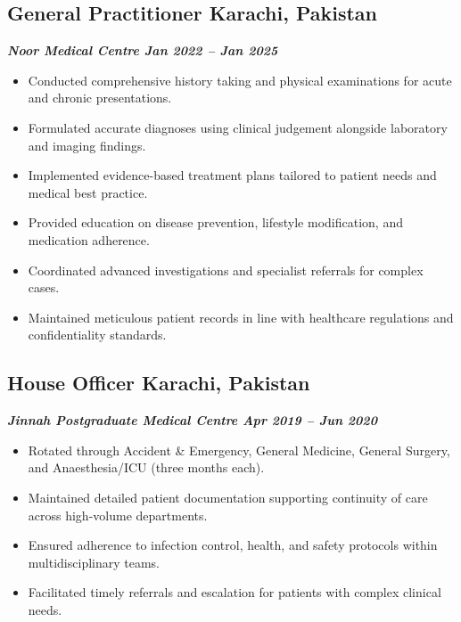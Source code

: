 \documentclass[a4paper,11pt]{article}
\begin{document}
\subsection*{General Practitioner \hfill Karachi, Pakistan}
\vspace{-0.6em}
\textbf{\textit{Noor Medical Centre \hfill Jan 2022 -- Jan 2025}}
\vspace{-0.6em}
\begin{itemize}
    \item Conducted comprehensive history taking and physical examinations for acute and chronic presentations.
    \item Formulated accurate diagnoses using clinical judgement alongside laboratory and imaging findings.
    \item Implemented evidence-based treatment plans tailored to patient needs and medical best practice.
    \item Provided education on disease prevention, lifestyle modification, and medication adherence.
    \item Coordinated advanced investigations and specialist referrals for complex cases.
    \item Maintained meticulous patient records in line with healthcare regulations and confidentiality standards.
\end{itemize}

\subsection*{House Officer \hfill Karachi, Pakistan}
\vspace{-0.6em}
\textbf{\textit{Jinnah Postgraduate Medical Centre \hfill Apr 2019 -- Jun 2020}}
\vspace{-0.6em}
\begin{itemize}
    \item Rotated through Accident \& Emergency, General Medicine, General Surgery, and Anaesthesia/ICU (three months each).
    \item Maintained detailed patient documentation supporting continuity of care across high-volume departments.
    \item Ensured adherence to infection control, health, and safety protocols within multidisciplinary teams.
    \item Facilitated timely referrals and escalation for patients with complex clinical needs.
\end{itemize}
\end{document}
